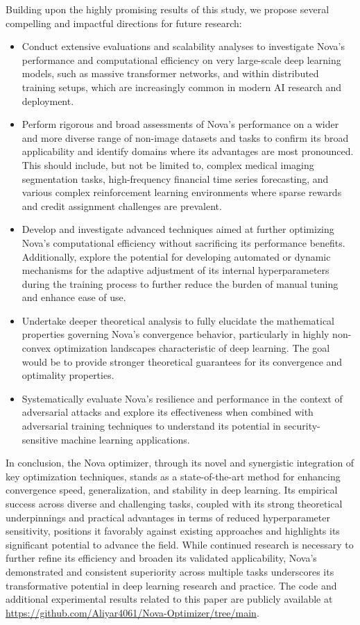 \documentclass{article}
\begin{document}
Building upon the highly promising results of this study, we propose several compelling and impactful directions for future research:
\begin{itemize}
    \item Conduct extensive evaluations and scalability analyses to investigate Nova's performance and computational efficiency on very large-scale deep learning models, such as massive transformer networks, and within distributed training setups, which are increasingly common in modern AI research and deployment.
    \item Perform rigorous and broad assessments of Nova's performance on a wider and more diverse range of non-image datasets and tasks to confirm its broad applicability and identify domains where its advantages are most pronounced. This should include, but not be limited to, complex medical imaging segmentation tasks, high-frequency financial time series forecasting, and various complex reinforcement learning environments where sparse rewards and credit assignment challenges are prevalent.
    \item Develop and investigate advanced techniques aimed at further optimizing Nova's computational efficiency without sacrificing its performance benefits. Additionally, explore the potential for developing automated or dynamic mechanisms for the adaptive adjustment of its internal hyperparameters during the training process to further reduce the burden of manual tuning and enhance ease of use.
    \item Undertake deeper theoretical analysis to fully elucidate the mathematical properties governing Nova's convergence behavior, particularly in highly non-convex optimization landscapes characteristic of deep learning. The goal would be to provide stronger theoretical guarantees for its convergence and optimality properties.
    \item Systematically evaluate Nova's resilience and performance in the context of adversarial attacks and explore its effectiveness when combined with adversarial training techniques to understand its potential in security-sensitive machine learning applications.
\end{itemize}
In conclusion, the Nova optimizer, through its novel and synergistic integration of key optimization techniques, stands as a state-of-the-art method for enhancing convergence speed, generalization, and stability in deep learning. Its empirical success across diverse and challenging tasks, coupled with its strong theoretical underpinnings and practical advantages in terms of reduced hyperparameter sensitivity, positions it favorably against existing approaches and highlights its significant potential to advance the field. While continued research is necessary to further refine its efficiency and broaden its validated applicability, Nova's demonstrated and consistent superiority across multiple tasks underscores its transformative potential in deep learning research and practice.
The code and additional experimental results related to this paper are publicly available at \url{https://github.com/Aliyar4061/Nova-Optimizer/tree/main}.
\end{document}
